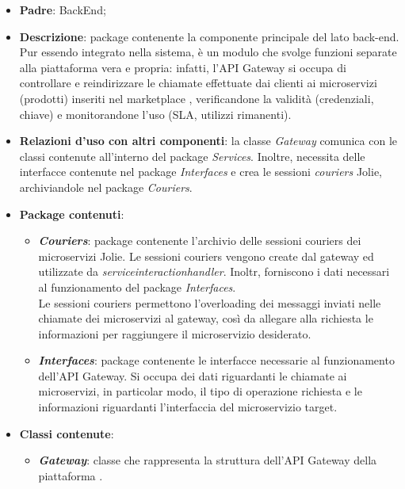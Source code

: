 \begin{itemize}
	\item \textbf{Padre}: BackEnd;
	
	\item \textbf{Descrizione}: package contenente la componente principale del lato back-end. Pur essendo integrato nella sistema, è un modulo che svolge funzioni separate alla piattaforma vera e propria: infatti, l'API Gateway si occupa di controllare e reindirizzare le chiamate effettuate dai clienti ai microservizi (prodotti) inseriti nel marketplace \progetto, verificandone la validità (credenziali, chiave) e monitorandone l'uso (SLA, utilizzi rimanenti).
	
	\item \textbf{Relazioni d'uso con altri componenti}: la classe \textit{Gateway} comunica con le classi contenute all'interno del package \textit{Services}. Inoltre, necessita delle interfacce contenute nel package \textit{Interfaces} e crea le sessioni \textit{couriers} Jolie, archiviandole nel package \textit{Couriers}.
	
	\item \textbf{Package contenuti}:
	\begin{itemize}
		\item \textbf{\textit{Couriers}}: package contenente l'archivio delle sessioni couriers dei microservizi Jolie. Le sessioni couriers vengono create dal gateway ed utilizzate da \textit{serviceinteractionhandler}. Inoltr, forniscono i dati necessari al funzionamento del package \textit{Interfaces}.\\
		Le sessioni couriers permettono l'overloading dei messaggi inviati nelle chiamate dei microservizi al gateway, così da allegare alla richiesta le informazioni per raggiungere il microservizio desiderato.
		
		\item \textbf{\textit{Interfaces}}: package contenente le interfacce necessarie al funzionamento dell'API Gateway. Si occupa dei dati riguardanti le chiamate ai microservizi, in particolar modo, il tipo di operazione richiesta e le informazioni riguardanti l'interfaccia del microservizio target.
	\end{itemize}
	\item \textbf{Classi contenute}:
		\begin{itemize}
			\item \textbf{\textit{Gateway}}: classe che rappresenta la struttura dell'API Gateway della piattaforma \progetto.
		\end{itemize}
\end{itemize}

